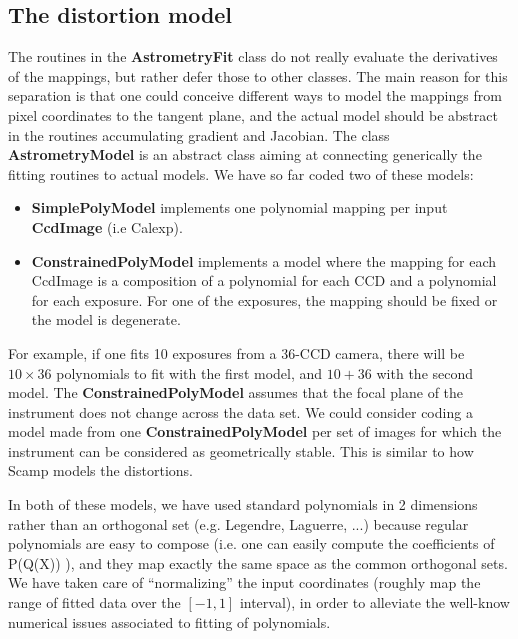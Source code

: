 \documentclass[a4paper,12pt]{scrartcl}
\newcommand{\ClName}[1]{{\bf #1}}
\def\bf{\normalfont\bfseries}
\begin{document}
\subsection{The distortion model}
The routines in the \ClName{AstrometryFit} class do not really evaluate
the derivatives of the mappings, but rather defer those to other classes.
The main reason for this separation is that one could conceive
different ways to model the mappings from pixel coordinates to
the tangent plane, and the actual model should be abstract
in the routines accumulating gradient and Jacobian. The class
\ClName{AstrometryModel} is an abstract class aiming at
connecting generically the fitting routines to actual models.
We have so far coded two of these models:
\begin{itemize} 
\item \ClName{SimplePolyModel} implements 
one polynomial mapping per input \ClName{CcdImage} (i.e Calexp).
\item \ClName{ConstrainedPolyModel} implements a model
where the mapping for each CcdImage is a composition of a polynomial
for each CCD and a polynomial for each exposure. For one of the exposures,
the mapping should be fixed or the model is degenerate.
\end{itemize}
For example, if one fits 10 exposures from a 36-CCD camera,
there will be $10\times 36$ polynomials to fit with the first model, and
$10+36$ with the second model. The  \ClName{ConstrainedPolyModel}
assumes that the focal plane of the instrument does not change
across the data set. We could consider coding a model 
made from one \ClName{ConstrainedPolyModel} per set of images
for which the instrument can be considered as geometrically stable.
This is similar to how Scamp models the distortions.

In both of these models, we have used standard polynomials in 2
dimensions rather than an orthogonal set (e.g. Legendre, Laguerre,
...)  because regular polynomials are easy to compose (i.e. one can
easily compute the coefficients of P(Q(X)) ), and they map exactly the
same space as the common orthogonal sets. We have taken care of
``normalizing'' the input coordinates (roughly map the range of fitted
data over the $[-1,1]$ interval), in order to alleviate the well-know
numerical issues associated to fitting of polynomials.
\end{document}
